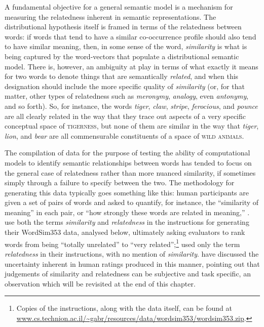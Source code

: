 A fundamental objective for a general semantic model is a mechanism for measuring the relatedness inherent in semantic representations.  The distributional hypothesis itself is framed in terms of the relatedness between words: if words that tend to have a similar co-occurrence profile should also tend to have similar meaning, then, in some sense of the word, \emph{similarity} is what is being captured by the word-vectors that populate a distributional semantic model.  There is, however, an ambiguity at play in terms of what exactly it means for two words to denote things that are semantically \emph{related}, and when this designation should include the more specific quality of \emph{similarity} (or, for that matter, other types of relatedness such as \emph{meronymy}, \emph{analogy}, even \emph{antonymy}, and so forth).  So, for instance, the words \emph{tiger}, \emph{claw}, \emph{stripe}, \emph{ferocious}, and \emph{pounce} are all clearly related in the way that they trace out aspects of a very specific conceptual space of \textsc{tigerness}, but none of them are similar in the way that \emph{tiger}, \emph{lion}, and \emph{bear} are all commensurable constituents of a space of \textsc{wild animals}.

The compilation of data for the purpose of testing the ability of computational models to identify semantic relationships between words has tended to focus on the general case of relatedness rather than more nuanced similarity, if sometimes simply through a failure to specify between the two.  The methodology for generating this data typically goes something like this: human participants are given a set of pairs of words and asked to quantify, for instance, the ``similarity of meaning'' \citep[][p. 628]{RubensteinEA1965} in each pair, or ``how strongly these words are related in meaning,'' \citep[][p. 124]{YangEA2006}.  \cite{FinkelsteinEA2002} use both the terms \emph{similarity} and \emph{relatedness} in the instructions for generating their WordSim353 data, analysed below, ultimately asking evaluators to rank words from being ``totally unrelated'' to ``very related'';\footnote{Copies of the instructions, along with the data itself, can be found at \url{www.cs.technion.ac.il/~gabr/resources/data/wordsim353/wordsim353.zip}.} \cite{BruniEA2012} used only the term \emph{relatedness} in their instructions, with no mention of \emph{similarity}.  \cite{FaruquiEA2016} have discussed the uncertainty inherent in human ratings produced in this manner, pointing out that judgements of similarity and relatedness can be subjective and task specific, an observation which will be revisited at the end of this chapter.

